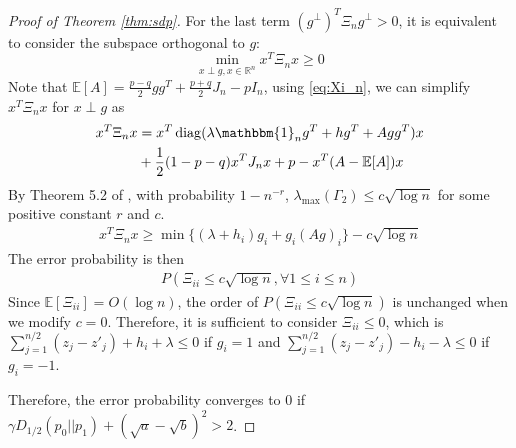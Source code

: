 \documentclass[conference]{IEEEtran}
\DeclareMathOperator{\diag}{diag}
\begin{document}
\begin{proof}[Proof of Theorem \ref{thm:sdp}]
		For the last term $(g^{\perp})^T \Xi_n g^{\perp} >0$, it is equivalent
		to consider the subspace orthogonal to $g$:
		$$
		\min_{x \perp g, x \in \mathbb{R}^n } x^T \Xi_n x \geq 0
		$$
		Note that $\mathbb{E}[A] = \frac{p-q}{2}gg^T + \frac{p+q}{2}J_n - pI_n$,
		using \eqref{eq:Xi_n}, we can simplify $x^T \Xi_n x$ for $x \perp g$ as
		\begin{align*}
		x^T \Xi_n x &= x^T \diag( \lambda \mathbbm{1}_ng^T+hg^T + Agg^T) x  \\
		&+ \frac{1}{2}(1-p-q)x^TJ_n x
		 + p -x^T(A-\mathbb{E}[A])x
		\end{align*}
		By Theorem 5.2 of \cite{lei2015consistency},
		with probability $1-n^{-r}$, $\lambda_{\max}(\Gamma_2) \leq c\sqrt{\log n}$ for some positive constant $r$ and $c$.
		\begin{align*}
		x^T \Xi_n x \geq \min\{(\lambda + h_i) g_i + g_i (Ag)_i \} - c \sqrt{\log n}
		\end{align*}
		The error probability is then
		\begin{align*}
		P(\Xi_{ii} \leq c\sqrt{\log n}, \forall 1\leq i \leq n)
		\end{align*}
		Since $\mathbb{E}[\Xi_{ii}]=O(\log n)$, the order of $P(\Xi_{ii} \leq c\sqrt{\log n})$ is unchanged when we modify $c=0$. Therefore, it is sufficient to consider $\Xi_{ii} \leq 0 $, which is
		$\sum_{j=1}^{n/2} (z_j - z'_j) + h_i + \lambda \leq 0$ if $g_i=1$ and
		$\sum_{j=1}^{n/2} (z_j - z'_j) - h_i - \lambda \leq 0$ if $g_i = -1$.
	
		Therefore, the error probability converges to 0
		if $\gamma D_{1/2}(p_0||p_1) + (\sqrt{a} - \sqrt{b})^2 > 2$.
		
	\end{proof}
	
	
	
\end{document}
